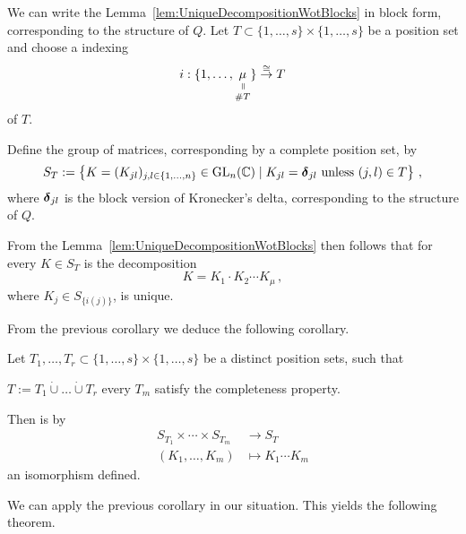 \begin{cor}
  We can write the Lemma~\ref{lem:UniqueDecompositionWotBlocks} in block form,
  corresponding to the structure of $Q$.
  Let $T\subset\{1,\dots,s\}\times\{1,\dots,s\}$ be a position set and choose a
  indexing
  \[
    i:\{1,\dots, \underset{\#T}{\underset{%
      \text{\rotatebox[origin=c]{-90}{$=$}}}{\mu}}\}\overset{\cong}{\to}T
  \]
  of $T$.
  \begin{s-defn}
    Define the group of matrices, corresponding by a complete position set, by
    \[
      S_T:=\left\{K=(K_{jl})_{j,l\in\{1,\dots,n\}}\in\operatorname{GL}_n(\mathbb{C})\mid
      K_{jl}=\boldsymbol{\delta}_{jl} \text{~unless~} (j,l)\in T \right\} \,,
    \]
    where $\boldsymbol{\delta}_{jl}$ is the block version of Kronecker's delta,
    corresponding to the structure of $Q$.
  \end{s-defn}
  From the Lemma~\ref{lem:UniqueDecompositionWotBlocks} then follows that for
  every $K\in S_T$ is the decomposition
  \[
    K=K_1\cdot K_2\cdots K_\mu \,,
  \]
  where $K_j\in S_{\{i(j)\}}$, is unique.
\end{cor}
From the previous corollary we deduce the following corollary.
\begin{cor}\label{cor:composeLevelwise}
  Let $T_1,\dots,T_r\subset\{1,\dots,s\}\times\{1,\dots,s\}$ be a distinct
  position sets, such that
  \begin{einr}
    $T:=T_1\dot\cup\dots\dot\cup T_r$  every $T_m$ satisfy
    the completeness property.
  \end{einr}
  Then is by
  \begin{align*}
    S_{T_1}\times\cdots\times S_{T_m} &\longrightarrow S_T
  \\(K_1,\dots,K_m) &\longmapsto K_1\cdots K_m
  \end{align*}
  an isomorphism defined.
\end{cor}
We can apply the previous corollary in our situation. This yields the following
theorem.
